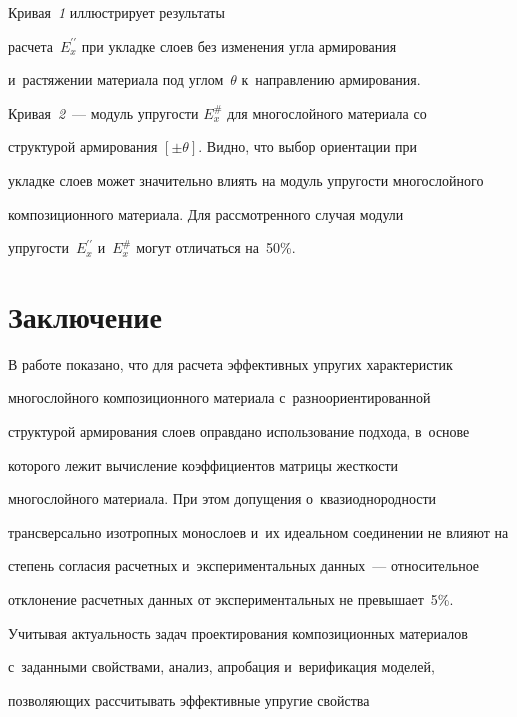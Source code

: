 Кривая~\textit{1} иллюстрирует результаты 


расчета~$E_x^{\prime\prime}$ при укладке слоев без изменения угла армирования 


и~растяжении материала под углом~$\theta$ к~на\-прав\-ле\-нию армирования. 


Кривая~\textit{2}~--- модуль упру\-гости  $E_x^{\#}$ для многослойного материала со 


структурой армирования $[\pm \theta]$. Видно, что выбор ориентации при 


укладке слоев может значительно влиять на модуль упругости многослойного 


композиционного материала. Для рассмотренного случая модули  


упру\-гости~$E^{\prime\prime}_x$ и~$E_x^\#$ могут отличаться на~50\%.














\section{Заключение}





    В работе показано, что для расчета эффективных упругих характеристик 


многослойного композиционного материала с~разноориентированной 


структурой армирования слоев оправдано использование подхода, в~основе 


которого лежит вычисление коэффициентов мат\-ри\-цы жест\-кости 


многослойного материала. При этом допущения о~квазиоднородности 


трансверсально изотропных монослоев и~их идеальном соединении не влияют на 


степень согласия расчетных и~экспериментальных данных~--- относительное 


отклонение расчетных данных от экспериментальных не превышает~5\%. 


Учитывая актуальность задач проектирования композиционных материалов 


с~заданными свойствами, анализ, апробация и~верификация моделей,  


поз\-во\-ля\-ющих рассчитывать эффективные упругие свойства 



